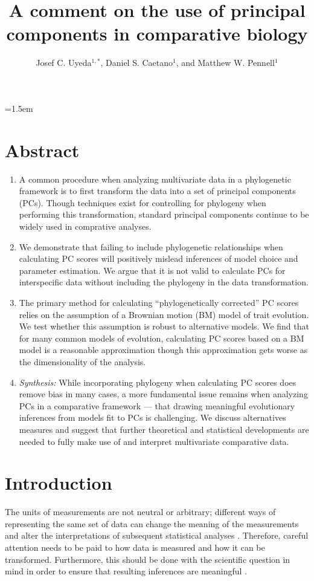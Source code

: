 \documentclass[a4paper,12pt]{article}
\title{A comment on the use of principal components in comparative biology}
\author{
Josef C. Uyeda$^{1,*}$, Daniel S. Caetano$^1$, and Matthew W. Pennell$^1$
}
\date{}
\affiliation{
 $^{1}$ Department of Biological Sciences \& Institute for Bioinformatics and Evolutionary Studies, University of Idaho, Moscow, ID 83844, U.S.A.\\ 
 $^{*}$ Email for correspondence: \texttt{pseudacris@gmail.com}\\
}
\begin{document}
\mstitlepage
\parindent=1.5em
\addtolength{\parskip}{.3em}
\vfill

\section{Abstract}
\begin{enumerate}
\item A common procedure when analyzing multivariate data in a phylogenetic framework is to first transform the data into a set of principal components (PCs). Though techniques exist for controlling for phylogeny when performing this transformation, standard principal components continue to be widely used in comprative analyses.

\item We demonstrate that failing to include phylogenetic relationships when calculating PC scores will positively mislead inferences of model choice and parameter estimation.  We argue that it is not valid to calculate PCs for interspecific data without including the phylogeny in the data transformation.

\item The primary method for calculating ``phylogenetically corrected'' PC scores relies on the assumption of a Brownian motion (BM) model of trait evolution. We test whether this assumption is robust to alternative models. We find that for many common models of evolution, calculating PC scores based on a BM model is a reasonable approximation though this approximation gets worse as the dimensionality of the analysis.

\item \emph{Synthesis:} While incorporating phylogeny when calculating PC scores does remove bias in many cases, a more fundamental issue remains when analyzing PCs in a comparative framework --- that drawing meaningful evolutionary inferences from models fit to PCs is challenging. We discuss alternatives measures and suggest that further theoretical and statistical developments are needed to fully make use of and interpret multivariate comparative data.
\end{enumerate} 

\newpage

\section{Introduction}
The units of measurements are not neutral or arbitrary; different ways of representing the same set of data can change the meaning of the measurements and alter the interpretations of subsequent statistical analyses \citep{Hand2004, HansenHoule2008, Houle2011}. Therefore, careful attention needs to be paid to how data is measured and how it can be transformed. Furthermore, this should be done with the scientific question in mind in order to ensure that resulting inferences are meaningful \citep{Houle2011}. 
\end{document}
